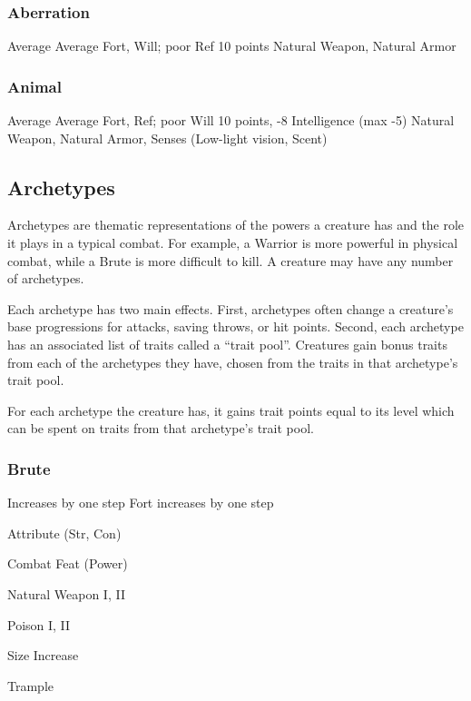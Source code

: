 \subsubsection{Aberration}
\tbab Average
\tsaves Average Fort, Will; poor Ref
 10 points
 Natural Weapon, Natural Armor

\subsubsection{Animal}
\tbab Average
\tsaves Average Fort, Ref; poor Will
 10 points, -8 Intelligence (max -5)
 Natural Weapon, Natural Armor, Senses (Low-light vision, Scent)

\subsection{Archetypes}
Archetypes are thematic representations of the powers a creature has and the role it plays in a typical combat. For example, a Warrior is more powerful in physical combat, while a Brute is more difficult to kill. A creature may have any number of archetypes.

Each archetype has two main effects. First, archetypes often change a creature's base progressions for attacks, saving throws, or hit points. Second, each archetype has an associated list of traits called a ``trait pool''. Creatures gain bonus traits from each of the archetypes they have, chosen from the traits in that archetype's trait pool.

For each archetype the creature has, it gains trait points equal to its level which can be spent on traits from that archetype's trait pool.

\subsubsection{Brute}
\tbab Increases by one step
\tsaves Fort increases by one step
\begin{itemize*}
    \item Attribute (Str, Con)
    \item Combat Feat (Power)
    \item Natural Weapon I, II
    \item Poison I, II
    \item Size Increase
    \item Trample
\end{itemize*}

